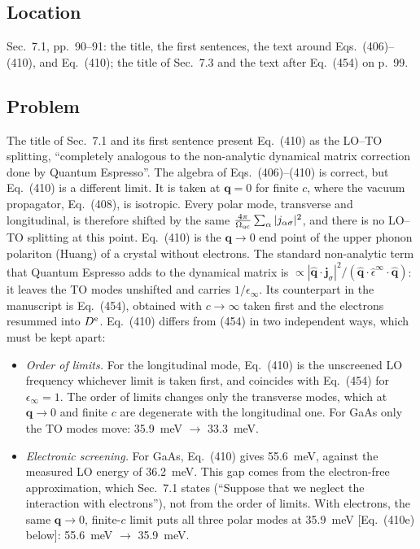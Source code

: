 \documentclass[11pt]{article}
\begin{document}
\subsection{Location}
Sec.~7.1, pp.~90--91: the title, the first sentences, the text around Eqs.~(406)--(410), and Eq.~(410);
the title of Sec.~7.3 and the text after Eq.~(454) on p.~99.

\subsection{Problem}
The title of Sec.~7.1 and its first sentence present Eq.~(410) as the LO--TO splitting, ``completely
analogous to the non-analytic dynamical matrix correction done by Quantum Espresso''. The algebra of
Eqs.~(406)--(410) is correct, but Eq.~(410) is a different limit. It is taken at $\mathbf q=0$ for finite
$c$, where the vacuum propagator, Eq.~(408), is isotropic. Every polar mode, transverse and longitudinal,
is therefore shifted by the same $\frac{4\pi}{\Omega_{\rm uc}}\sum_\alpha|j_{\alpha\sigma}|^2$, and there is no
LO--TO splitting at this point. Eq.~(410) is the $\mathbf q\to0$ end point of the upper phonon polariton
(Huang) of a crystal without electrons. The standard non-analytic term that Quantum Espresso adds to
the dynamical matrix is $\propto|\hat{\mathbf q}\cdot\mathbf j_\sigma|^2/(\hat{\mathbf q}\cdot\hat\epsilon^\infty
\cdot\hat{\mathbf q})$: it leaves the TO modes unshifted and carries $1/\epsilon_\infty$. Its counterpart in
the manuscript is Eq.~(454), obtained with $c\to\infty$ taken first and the electrons resummed into
$D^{\rm e}$. Eq.~(410) differs from (454) in two independent ways, which must be kept apart:
\begin{itemize}
\item[(a)] \emph{Order of limits.} For the longitudinal mode, Eq.~(410) is the unscreened LO frequency
whichever limit is taken first, and coincides with Eq.~(454) for $\epsilon_\infty=1$. The order of limits
changes only the transverse modes, which at $\mathbf q\to0$ and finite $c$ are degenerate with the
longitudinal one. For GaAs only the TO modes move: 35.9~meV $\to$ 33.3~meV.
\item[(b)] \emph{Electronic screening.} For GaAs, Eq.~(410) gives 55.6~meV, against the measured LO
energy of 36.2~meV. This gap comes from the electron-free approximation, which Sec.~7.1 states
(``Suppose that we neglect the interaction with electrons''), not from the order of limits. With
electrons, the same $\mathbf q\to0$, finite-$c$ limit puts all three polar modes at 35.9~meV
[Eq.~(410e) below]: 55.6~meV $\to$ 35.9~meV.
\end{itemize}
\end{document}
